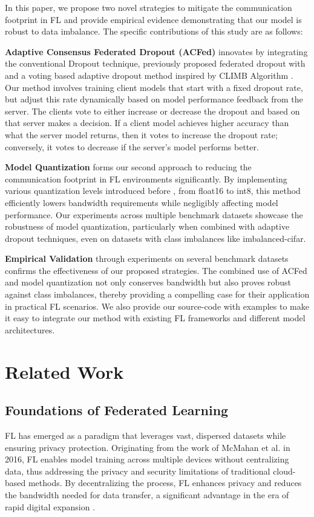\documentclass{article}
\begin{document}
In this paper, we propose two novel strategies to mitigate the communication footprint in FL and provide empirical evidence demonstrating that our model is robust to data imbalance. The specific contributions of this study are as follows:

\textbf{Adaptive Consensus Federated Dropout (ACFed)} innovates by integrating the conventional Dropout \cite{srivastava2014dropout} technique, previously proposed federated dropout \cite{wen2022federated} with and a voting based adaptive dropout method inspired by CLIMB Algorithm \cite{shen2021agnostic}. Our method involves training client models that start with a fixed dropout rate, but adjust this rate dynamically based on model performance feedback from the server. The clients vote to either increase or decrease the dropout and based on that server makes a decision. If a client model achieves higher accuracy than what the server model returns, then it votes to increase the dropout rate; conversely, it votes to decrease if the server's model performs better.\par

\textbf{Model Quantization} forms our second approach to reducing the communication footprint in FL environments significantly. By implementing various quantization levels introduced before \cite{jacob2018quantization}, from float16 to int8, this method efficiently lowers bandwidth requirements while negligibly affecting model performance. Our experiments across multiple benchmark datasets showcase the robustness of model quantization, particularly when combined with adaptive dropout techniques, even on datasets with class imbalances like imbalanced-cifar.\par

\textbf{Empirical Validation} through experiments on several benchmark datasets confirms the effectiveness of our proposed strategies. The combined use of ACFed and model quantization not only conserves bandwidth but also proves robust against class imbalances, thereby providing a compelling case for their application in practical FL scenarios. We also provide our source-code with examples to make it easy to integrate our method with existing FL frameworks and different model architectures.\par

\section{Related Work}

\subsection{Foundations of Federated Learning} 
FL has emerged as a paradigm that leverages vast, dispersed datasets while ensuring privacy protection. Originating from the work of McMahan et al.\cite{DBLP:journals/corr/McMahanMRA16} in 2016, FL enables model training across multiple devices without centralizing data, thus addressing the privacy and security limitations of traditional cloud-based methods. By decentralizing the process, FL enhances privacy and reduces the bandwidth needed for data transfer, a significant advantage in the era of rapid digital expansion \cite{ijerph20156539}.
\end{document}
